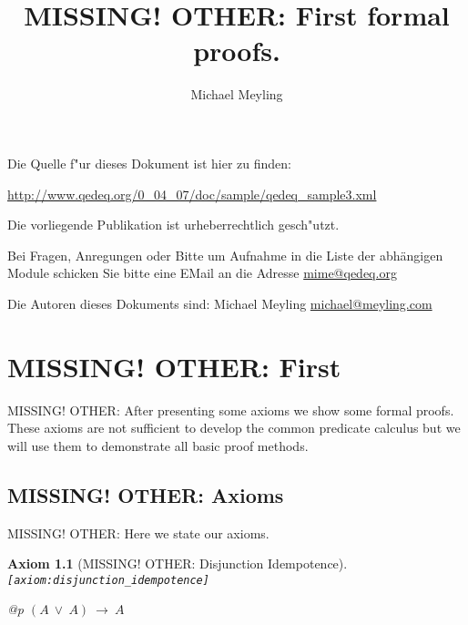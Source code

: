 \documentclass[a4paper,german,10pt,twoside]{book}
\title{MISSING! OTHER: First formal proofs.}
\author{
Michael Meyling
}
\newtheorem{ax}{Axiom}
\theoremstyle{definition}
\theoremstyle{remark}
\begin{document}
\maketitle

\setlength{\parskip}{5pt plus 2pt minus 1pt}
\mbox{}
\vfill

\par
Die Quelle f{"ur} dieses Dokument ist hier zu finden:
\par
\url{http://www.qedeq.org/0_04_07/doc/sample/qedeq_sample3.xml}

\par
Die vorliegende Publikation ist urheberrechtlich gesch{"u}tzt.
\par
Bei Fragen, Anregungen oder Bitte um Aufnahme in die Liste der abh{\"a}ngigen Module schicken Sie bitte eine EMail an die Adresse \href{mailto:mime@qedeq.org}{mime@qedeq.org}

\par
Die Autoren dieses Dokuments sind:
Michael Meyling \href{mailto:michael@meyling.com}{michael@meyling.com}



\setlength{\parskip}{0pt}
\tableofcontents

\setlength{\parskip}{5pt plus 2pt minus 1pt}

\chapter{MISSING! OTHER: First} \label{chapter1} \hypertarget{chapter1}{}

MISSING! OTHER: After presenting some axioms we show some formal proofs. These axioms are not sufficient to develop the common predicate calculus but we will use them to demonstrate all basic proof methods.

\section{MISSING! OTHER: Axioms} \label{chapter1_section1} \hypertarget{chapter1_section1}{}
MISSING! OTHER: Here we state our axioms.

\begin{ax}[MISSING! OTHER: Disjunction Idempotence]
\label{axiom:disjunction_idempotence} \hypertarget{axiom:disjunction_idempotence}{}
{\tt \tiny [\verb]axiom:disjunction_idempotence]]}
\mbox{}
\begin{longtable}{{@{\extracolsep{\fill}}p{\linewidth}}}
\centering $(A\ \lor\ A)\ \rightarrow\ A$
\end{longtable}

\end{ax}
\end{document}
